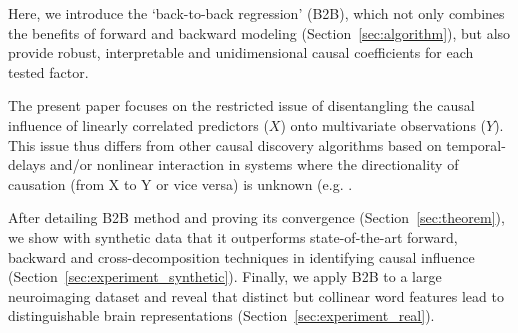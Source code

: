 Here, we introduce the `back-to-back regression' (B2B), which not only combines the benefits of forward and backward modeling (Section~\ref{sec:algorithm}), but also provide robust, interpretable and unidimensional causal coefficients for each tested factor.

The present paper focuses on the restricted issue of disentangling the causal influence of linearly correlated predictors ($X$) onto multivariate observations ($Y$). This issue thus differs from other causal discovery algorithms based on temporal-delays and/or nonlinear interaction in systems where the directionality of causation (from X to Y or vice versa) is unknown (e.g. \citep{peters2017elements, granger1969investigating, janzing2013quantifying, scholkopf2016modeling}.

After detailing B2B method and proving its convergence (Section~\ref{sec:theorem}), we show with synthetic data that it outperforms state-of-the-art forward, backward and cross-decomposition techniques in identifying causal influence (Section~\ref{sec:experiment_synthetic}). Finally, we apply B2B to a large neuroimaging dataset and reveal that distinct but collinear word features lead to distinguishable brain representations (Section~\ref{sec:experiment_real}).

